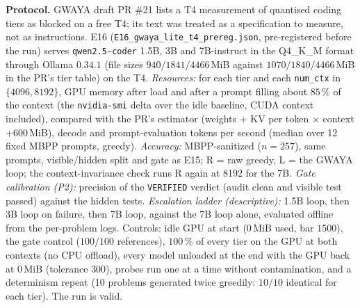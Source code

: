\documentclass[11pt,a4paper]{article}
\begin{document}
\textbf{Protocol.} GWAYA draft PR \#21 lists a T4 measurement of quantised coding tiers as blocked on a free T4; its text was treated as a specification to measure, not as instructions. E16 (\texttt{E16\_gwaya\_lite\_t4\_prereg.json}, pre-registered before the run) serves \texttt{qwen2.5-coder} 1.5B, 3B and 7B-instruct in the Q4\_K\_M format through Ollama $0.34.1$ (file sizes $940/1841/4466$\,MiB against $1070/1840/4466$\,MiB in the PR's tier table) on the T4. \emph{Resources:} for each tier and each \texttt{num\_ctx} in $\{4096, 8192\}$, GPU memory after load and after a prompt filling about $85\,\%$ of the context (the \texttt{nvidia-smi} delta over the idle baseline, CUDA context included), compared with the PR's estimator (weights $+$ KV per token $\times$ context $+ 600$\,MiB), decode and prompt-evaluation tokens per second (median over 12 fixed MBPP prompts, greedy). \emph{Accuracy:} MBPP-sanitized ($n=257$), same prompts, visible/hidden split and gate as E15; R = raw greedy, L = the GWAYA loop; the context-invariance check runs R again at 8192 for the 7B. \emph{Gate calibration (P2):} precision of the \texttt{VERIFIED} verdict (audit clean and visible test passed) against the hidden tests. \emph{Escalation ladder (descriptive):} 1.5B loop, then 3B loop on failure, then 7B loop, against the 7B loop alone, evaluated offline from the per-problem logs. Controls: idle GPU at start ($0$\,MiB used, bar $1500$), the gate control ($100/100$ references), $100\,\%$ of every tier on the GPU at both contexts (no CPU offload), every model unloaded at the end with the GPU back at $0$\,MiB (tolerance $300$), probes run one at a time without contamination, and a determinism repeat (10 problems generated twice greedily: $10/10$ identical for each tier). The run is valid.
\end{document}

